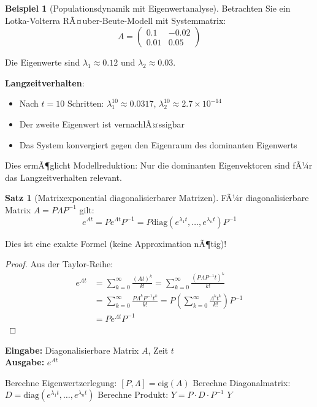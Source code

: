 ﻿\documentclass[a4paper,12pt]{report}
\theoremstyle{definition}
\newtheorem{beispiel}{Beispiel}
\newtheorem{satz}{Satz}
\begin{document}
	\begin{beispiel}[Populationsdynamik mit Eigenwertanalyse]
		Betrachten Sie ein Lotka-Volterra RÃ¤uber-Beute-Modell mit Systemmatrix:
		\[
		A = \begin{pmatrix}
			0.1 & -0.02 \\
			0.01 & 0.05
		\end{pmatrix}
		\]
		
		Die Eigenwerte sind $\lambda_1 \approx 0.12$ und $\lambda_2 \approx 0.03$.
		
		\textbf{Langzeitverhalten}:
		\begin{itemize}
			\item Nach $t = 10$ Schritten: $\lambda_1^{10} \approx 0.0317$, $\lambda_2^{10} \approx 2.7 \times 10^{-14}$
			\item Der zweite Eigenwert ist vernachlÃ¤ssigbar
			\item Das System konvergiert gegen den Eigenraum des dominanten Eigenwerts
		\end{itemize}
		
		Dies ermÃ¶glicht Modellreduktion: Nur die dominanten Eigenvektoren sind fÃ¼r das Langzeitverhalten relevant.
	\end{beispiel}
	
	\begin{satz}[Matrixexponential diagonalisierbarer Matrizen]
		FÃ¼r diagonalisierbare Matrix $A = P \Lambda P^{-1}$ gilt:
		\[
		e^{At} = P e^{\Lambda t} P^{-1} = P \text{diag}(e^{\lambda_1 t}, \ldots, e^{\lambda_n t}) P^{-1}
		\]
		
		Dies ist eine exakte Formel (keine Approximation nÃ¶tig)!
	\end{satz}
	
	\begin{proof}
		Aus der Taylor-Reihe:
		\begin{align}
			e^{At} &= \sum_{k=0}^{\infty} \frac{(At)^k}{k!} = \sum_{k=0}^{\infty} \frac{(P \Lambda P^{-1} t)^k}{k!} \\
			&= \sum_{k=0}^{\infty} \frac{P \Lambda^k P^{-1} t^k}{k!} = P \left(\sum_{k=0}^{\infty} \frac{\Lambda^k t^k}{k!}\right) P^{-1} \\
			&= P e^{\Lambda t} P^{-1}
		\end{align}
	\end{proof}
	
	\begin{algorithm}[H]
		\caption{Matrixexponential via Eigenwertzerlegung}
		\label{alg:matrix-exp-eigenvalue}
		\textbf{Eingabe:} Diagonalisierbare Matrix $A$, Zeit $t$ \\
		\textbf{Ausgabe:} $e^{At}$
		\begin{algorithmic}[1]
			\State Berechne Eigenwertzerlegung: $[P, \Lambda] = \text{eig}(A)$
			\State Berechne Diagonalmatrix: $D = \text{diag}(e^{\lambda_1 t}, \ldots, e^{\lambda_n t})$
			\State Berechne Produkt: $Y = P \cdot D \cdot P^{-1}$
			\State \Return $Y$
		\end{algorithmic}
	\end{algorithm}
	
\end{document}
